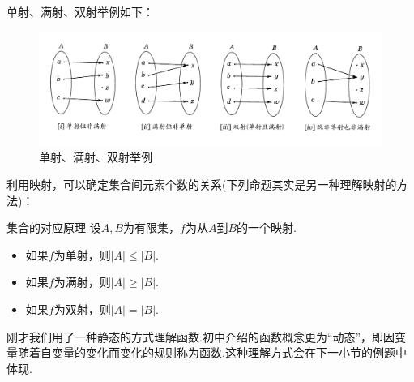 \documentclass[lang=cn, zihao=5]{elegantbook}
\begin{document}
单射、满射、双射举例如下：

\begin{figure}[h!]
	\centering
	\includegraphics[width=17cm]{attachment/20230403teuuykue.pdf}
	\caption{单射、满射、双射举例}
\end{figure}

利用映射，可以确定集合间元素个数的关系(下列命题其实是另一种理解映射的方法)：

\begin{proposition}{集合的对应原理}
	设$A,B$为有限集，$f$为从$A$到$B$的一个映射. 
	\begin{itemize}
		\item 如果$f$为单射，则$|A| \leq |B|$. 
		\item 如果$f$为满射，则$|A| \geq |B|$. 
		\item 如果$f$为双射，则$|A| = |B|$. 
	\end{itemize}
\end{proposition}

刚才我们用了一种静态的方式理解函数.初中介绍的函数概念更为“动态”，即因变量随着自变量的变化而变化的规则称为函数.这种理解方式会在下一小节的例题中体现.
\end{document}
